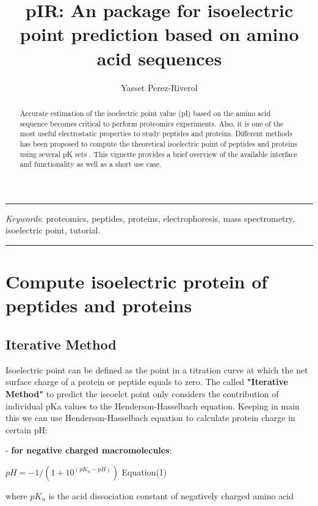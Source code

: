 \documentclass{article}
\title{pIR: An \R{} package for isoelectric point prediction based on amino acid sequences}
\author{Yasset Perez-Riverol}
\begin{document}


\maketitle


\hrule
\begin{abstract}
   Accurate estimation of the isoelectric point value (pI) based on the amino acid sequence becomes critical to perform proteomics experiments. Also, it is one of the most useful electrostatic properties to study peptides and proteins. Different methods has been proposed to compute the theoretical isoelectric point of peptides and proteins using several pK sets \cite{perez2012, bjellqvist1993}. This vignette provides a brief overview of the available interface and functionality as well as a short use case.
\end{abstract}

\textit{Keywords}: proteomics, peptides, proteins, electrophoresis, mass spectrometry, isoelectric point, tutorial.
\hrule
{}
\vspace{10mm}


\tableofcontents

\section{Compute isoelectric protein of peptides and proteins}
\subsection{Iterative Method}
 Isoelectric point can be defined as the point in a titration curve at which the net surface charge of a protein or peptide equals to zero. The called \textbf{"Iterative Method"} to predict the iseoelct point only considers the contribution of individual pKa values to the Henderson-Hasselbach equation. Keeping in main this we can use Henderson-Hasselbach equation to calculate protein charge in certain pH:

- \textbf{for negative charged macromolecules}:

\begin{center}
        \( pH = -1/(1+10^{(pK_n - pH)}) \)   Equation(1)
\end{center}

where \(pK_n\) is the acid dissociation constant of negatively charged amino acid
\end{document}
